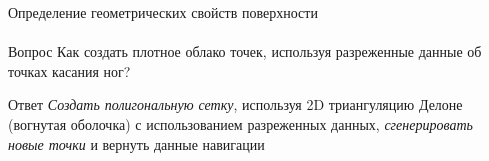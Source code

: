\documentclass[aspectratio=169,xcolor=table]{beamer}
\begin{document}

\begin{frame}[t]{Определение геометрических свойств поверхности}
    \framesubtitle{}
    {\large\begin{block}{Вопрос}
        Как создать плотное облако точек, используя разреженные данные об точках касания ног?
        \end{block}}
    {\large\begin{alertblock}{Ответ}
            \centering \textit{Создать полигональную сетку}, используя 2D триангуляцию Делоне (вогнутая оболочка) с использованием разреженных данных, \textit{сгенерировать новые точки} и вернуть данные навигации
        \end{alertblock}}
\end{frame}
\end{document}
